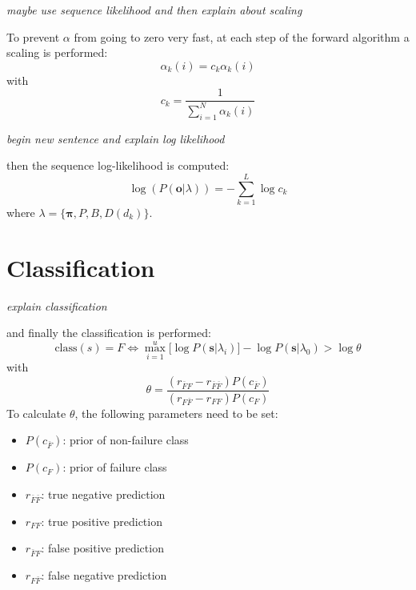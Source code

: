 \documentclass[mscthesis]{usiinfthesis}
\begin{document}
\emph{\color{red}maybe use sequence likelihood and then explain about scaling}

To prevent $ \alpha $ from going to zero very fast, at each step of the forward
algorithm a scaling is performed:
\begin{equation}
    \alpha_k(i) = c_k \alpha_k(i)
\end{equation}
with
\begin{equation}
    c_k = \frac{1}{\sum\limits_{i=1}^{N} \alpha_k(i)}
\end{equation}

\emph{\color{red}begin new sentence and explain log likelihood}

then the sequence log-likelihood is computed:
\begin{equation}
    \log(P(\boldsymbol{o}|\lambda)) = -\sum\limits_{k=1}^{L} \log c_k
\end{equation}
where $ \lambda = \{\boldsymbol{\pi}, P, B, D(d_k) \} $.

\section{Classification}

\emph{\color{red}explain classification}

and finally the
classification is performed:
\begin{equation}
    \label{eq:class}
    \text{class}(s) = F \iff \max_{i=1}^{u} \big [
        \log P(\boldsymbol{s}|\lambda_i)
    \big ] - \log P(\boldsymbol{s}|\lambda_0) > \log \theta
\end{equation}
with
\begin{equation}
    \label{eq:class_thresh}
    \theta = \frac{(r_{\bar{F}F} - r_{\bar{F}\bar{F}})P(c_{\bar{F}})}
        {(r_{F \bar{F}} - r_{FF})P(c_{F})}
\end{equation}
To calculate $ \theta $, the following parameters need to be set:
\begin{itemize}
    \item $ P(c_{\bar{F}}) $: prior of non-failure class
    \item $ P(c_F) $: prior of failure class
    \item $ r_{\bar{F}\bar{F}} $: true negative prediction
    \item $ r_{FF} $: true positive prediction
    \item $ r_{\bar{F}F} $: false positive prediction
    \item $ r_{F\bar{F}} $: false negative prediction
\end{itemize}
\end{document}
